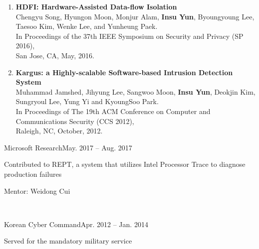 \documentclass[11pt,letterpaper]{article}
\begin{document}
\begin{enumerate}
{  }
  \item \textbf{HDFI: Hardware-Assisted Data-flow Isolation} \\
  {\footnotesize
    Chengyu Song, Hyungon Moon, Monjur Alam, \textbf{Insu Yun}, Byoungyoung Lee,
    Taesoo Kim, Wenke Lee, and Yunheung Paek. \\
    In Proceedings of the 37th IEEE Symposium on Security and Privacy (SP 2016), \\
    San Jose, CA, May, 2016.
  }
  \item \textbf{Kargus: a Highly-scalable Software-based Intrusion Detection System} \\
  {\footnotesize
    Muhammad Jamshed, Jihyung Lee, Sangwoo Moon, \textbf{Insu Yun}, Deokjin
    Kim, Sungryoul Lee, Yung Yi and KyoungSoo Park. \\
    In Proceedings of The 19th ACM Conference on Computer and Communications Security (CCS 2012), \\
    Raleigh, NC, October, 2012.
  }
\end{enumerate}

%
%

\begin{envtime}{Microsoft Research}{May. 2017 -- Aug. 2017}
\item Contributed to REPT, a system that utilizes Intel Processor Trace to diagnose production failures
  \item Mentor:  Weidong Cui
\end{envtime}
 \\
\begin{envtime}{Korean Cyber Command}{Apr. 2012 -- Jan. 2014}
  \item Served for the mandatory military service
\end{envtime}
\end{document}
